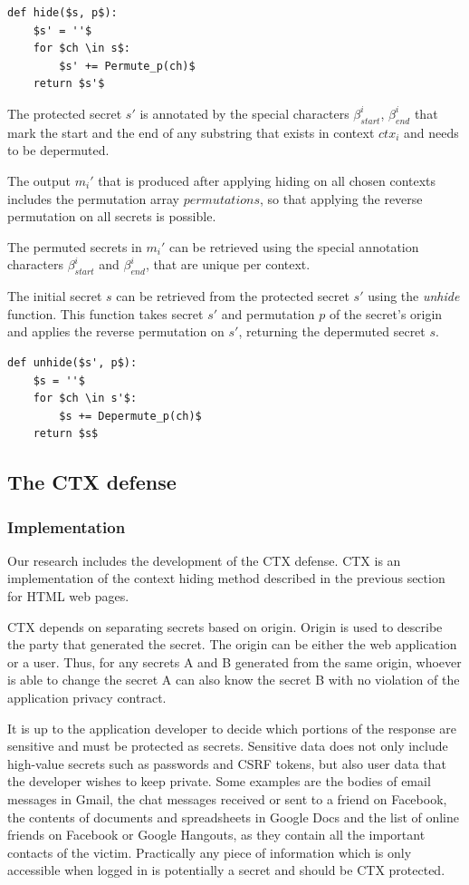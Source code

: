 \documentclass[conference, letterpaper, 10pt]{IEEEtran}
\begin{document}
\begin{lstlisting}[texcl,mathescape]
def hide($s, p$):
    $s' = ''$
    for $ch \in s$:
        $s' += Permute_p(ch)$
    return $s'$
\end{lstlisting}

The protected secret $s'$ is annotated by the special characters
$\beta_{start}^i$, $\beta_{end}^i$ that mark the start and the end of any
substring that exists in context $ctx_i$ and needs to be depermuted.

The output $m_i'$ that is produced after applying hiding on all chosen contexts
includes the permutation array $permutations$, so that applying the reverse
permutation on all secrets is possible.

The permuted secrets in $m_i'$ can be retrieved using the special annotation
characters $\beta_{start}^i$ and $\beta_{end}^i$, that are unique per context.

The initial secret $s$ can be retrieved from the protected secret $s'$
using the \textit{unhide} function. This function takes secret $s'$ and
permutation $p$ of the secret's origin and applies the reverse permutation on
$s'$, returning the depermuted secret $s$.

\begin{lstlisting}[texcl,mathescape]
def unhide($s', p$):
    $s = ''$
    for $ch \in s'$:
        $s += Depermute_p(ch)$
    return $s$
\end{lstlisting}

\subsection{The CTX defense}\label{subsec:ctx}

\subsubsection{Implementation}
Our research includes the development of the CTX defense. CTX is an
implementation of the context hiding method described in the previous section
for HTML web pages.

CTX depends on separating secrets based on origin. Origin is used to describe
the party that generated the secret. The origin can be either the web
application or a user. Thus, for any secrets A and B generated from the same
origin, whoever is able to change the secret A can also know the secret B with
no violation of the application privacy contract.

It is up to the application developer to decide which portions of the response
are sensitive and must be protected as secrets. Sensitive data does not only
include high-value secrets such as passwords and CSRF tokens, but also user data
that the developer wishes to keep private. Some examples are the bodies of email
messages in Gmail, the chat messages received or sent to a friend on Facebook,
the contents of documents and spreadsheets in Google Docs and the list of online
friends on Facebook or Google Hangouts, as they contain all the important
contacts of the victim. Practically any piece of information which is only
accessible when logged in is potentially a secret and should be CTX protected.
\end{document}

